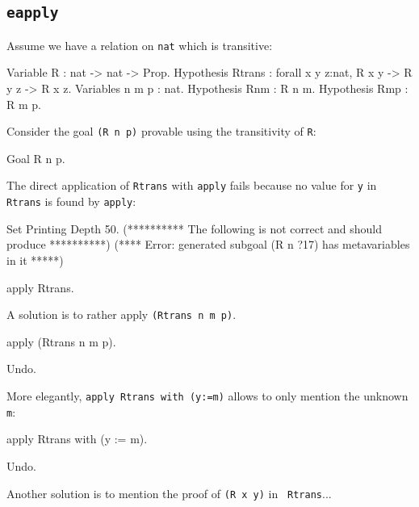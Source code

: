 \begin{coq_example*}
\section[\tt eapply]{\tt eapply
\label{eapply-example}}
\Example
Assume we have a relation on {\tt nat} which is transitive:

\begin{coq_example*}
Variable R : nat -> nat -> Prop.
Hypothesis Rtrans : forall x y z:nat, R x y -> R y z -> R x z.
Variables n m p : nat.
Hypothesis Rnm : R n m.
Hypothesis Rmp : R m p.
\end{coq_example*}

Consider the goal {\tt (R n p)} provable using the transitivity of
{\tt R}:

\begin{coq_example*}
Goal R n p.
\end{coq_example*}

The direct application of {\tt Rtrans} with {\tt apply} fails because
no value for {\tt y} in {\tt Rtrans} is found by {\tt apply}:

\begin{coq_eval}
Set Printing Depth 50.
(********** The following is not correct and should produce **********)
(**** Error: generated subgoal (R n ?17) has metavariables in it *****)
\end{coq_eval}
\begin{coq_example}
apply Rtrans.
\end{coq_example}

A solution is to rather apply {\tt (Rtrans n m p)}.

\begin{coq_example}
apply (Rtrans n m p).
\end{coq_example}

\begin{coq_eval}
Undo.
\end{coq_eval}

More elegantly, {\tt apply Rtrans with (y:=m)} allows to only mention
the unknown {\tt m}:

\begin{coq_example}

  apply Rtrans with (y := m).
\end{coq_example}

\begin{coq_eval}
Undo.
\end{coq_eval}

Another solution is to mention the proof of {\tt (R x y)} in {\tt
Rtrans}...


\end{coq_example*}
